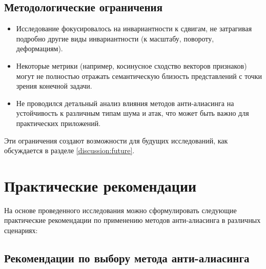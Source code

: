 \subsection{Методологические ограничения}
\label{discussion:limitations:methodology}

\begin{itemize}
    \item Исследование фокусировалось на инвариантности к сдвигам, не затрагивая подробно другие виды инвариантности (к масштабу, повороту, деформациям).
    
    \item Некоторые метрики (например, косинусное сходство векторов признаков) могут не полностью отражать семантическую близость представлений с точки зрения конечной задачи.
    
    \item Не проводился детальный анализ влияния методов анти-алиасинга на устойчивость к различным типам шума и атак, что может быть важно для практических приложений.
\end{itemize}

Эти ограничения создают возможности для будущих исследований, как обсуждается в разделе \ref{discussion:future}.

\section{Практические рекомендации}
\label{discussion:recommendations}

На основе проведенного исследования можно сформулировать следующие практические рекомендации по применению методов анти-алиасинга в различных сценариях:

\subsection{Рекомендации по выбору метода анти-алиасинга}
\label{discussion:recommendations:method}

